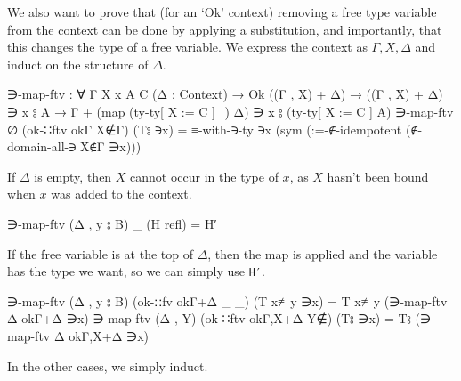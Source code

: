 \documentclass[logo,bsc,singlespacing,parskip,online]{infthesis}
\begin{document}
We also want to prove that (for an `Ok' context) removing a free type variable from the context can
be done by applying a substitution, and importantly, that this changes the type of a free variable.
We express the context as $\Gamma, X, \Delta$ and induct on the structure of $\Delta$.
\begin{code}
  ∋-map-ftv : ∀ {Γ X x A C} (Δ : Context)
    → Ok ((Γ , X) + Δ)
    → ((Γ , X) + Δ) ∋ x ⦂ A
    → Γ + (map (ty-ty[ X := C ]_) Δ) ∋ x ⦂ (ty-ty[ X := C ] A)
  ∋-map-ftv ∅ (ok-∷ftv okΓ X∉Γ) (T⦂ ∋x) =
    ≡-with-∋-ty ∋x
      (sym (:=-∉-idempotent (∉-domain-all-∋ X∉Γ ∋x)))
\end{code}
If $\Delta$ is empty, then $X$ cannot occur in the type of $x$, as $X$ hasn't been bound when $x$
was added to the context.
\begin{code}
  ∋-map-ftv (Δ , y ⦂ B) _ (H refl) = H′
\end{code}
If the free variable is at the top of $\Delta$, then the map is applied and the variable has the
type we want, so we can simply use \texttt{H′}.
\begin{code}
  ∋-map-ftv (Δ , y ⦂ B) (ok-∷fv okΓ+Δ _ _) (T x≢y ∋x) =
    T x≢y (∋-map-ftv Δ okΓ+Δ ∋x)
  ∋-map-ftv (Δ , Y) (ok-∷ftv okΓ,X+Δ Y∉) (T⦂ ∋x) =
    T⦂ (∋-map-ftv Δ okΓ,X+Δ ∋x)
\end{code}
In the other cases, we simply induct.
\end{document}
